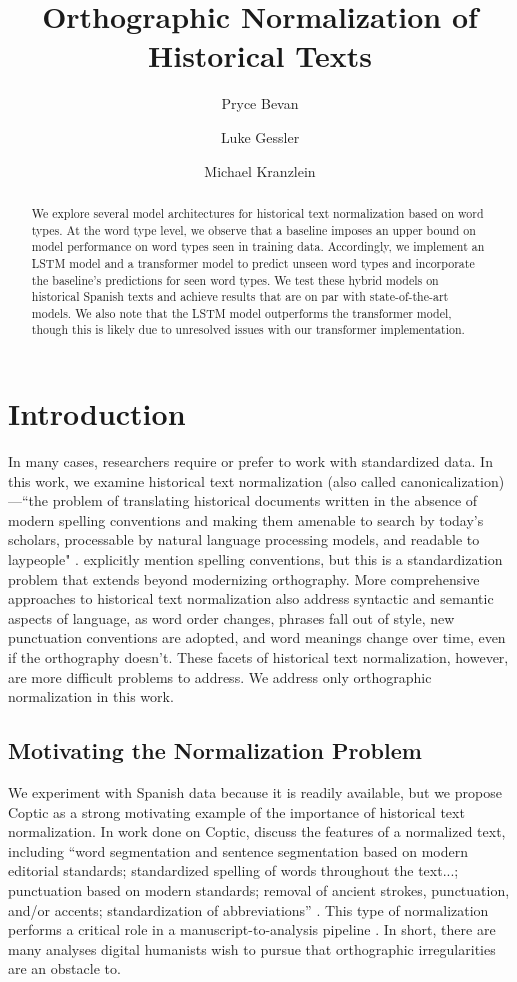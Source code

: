 \documentclass[11pt,a4paper]{article}
\title{Orthographic Normalization of Historical Texts}
\author[1]{Pryce Bevan}
\author[2]{Luke Gessler}
\author[1]{Michael Kranzlein}
\affil[1]{Georgetown University\\ Department of Computer Science}
\affil[2]{Georgetown University\\ Department of Linguistics}
\affil[ ]{\{\tt pwb8, lg876, mmk119\}@georgetown.edu}
\date{}
\begin{document}
\maketitle

\begin{abstract}
We explore several model architectures for historical text normalization based on word types. At the word type level, we observe that a baseline imposes an upper bound on model performance on word types seen in training data. Accordingly, we implement an LSTM model and a transformer model to predict unseen word types and incorporate the baseline's predictions for seen word types. We test these hybrid models on historical Spanish texts and achieve results that are on par with state-of-the-art models. We also note that the LSTM model outperforms the transformer model, though this is likely due to unresolved issues with our transformer implementation.
\end{abstract}

\section{Introduction}
In many cases, researchers require or prefer to work with standardized data. In this work, we examine historical text normalization (also called canonicalization)---``the problem of translating historical documents written in the absence of modern spelling conventions and making them amenable to search by today’s scholars, processable by natural language processing models, and readable to laypeople" \cite{bollmann_multi-task_2018}. \citeauthor{bollmann_multi-task_2018} explicitly mention spelling conventions, but this is a standardization problem that extends beyond modernizing orthography. More comprehensive approaches to historical text normalization also address syntactic and semantic aspects of language, as word order changes, phrases fall out of style, new punctuation conventions are adopted, and word meanings change over time, even if the orthography doesn't. These facets of historical text normalization, however, are more difficult problems to address. We address only orthographic normalization in this work.

\subsection{Motivating the Normalization Problem}
We experiment with Spanish data because it is readily available, but we propose Coptic as a strong motivating example of the importance of historical text normalization. In work done on Coptic, \citeauthor{schroeder_coptic_2013} discuss the features of a normalized text, including “word segmentation and sentence segmentation based on modern editorial standards; standardized spelling of words throughout the text...; punctuation based on modern standards; removal of ancient strokes, punctuation, and/or accents; standardization of abbreviations” \cite{schroeder_coptic_2013}. This type of normalization performs a critical role in a manuscript-to-analysis pipeline \cite{zeldes_nlp_2016}. In short, there are many analyses digital humanists wish to pursue that orthographic irregularities are an obstacle to.
\end{document}
